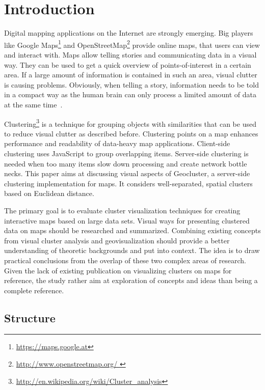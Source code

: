 
%
%

\chapter{Introduction}

Digital mapping applications on the Internet are strongly emerging. Big players like Google Maps\footnote{\url{https://maps.google.at}} and OpenStreetMap\footnote{\url{http://www.openstreetmap.org/ }} provide online maps, that users can view and interact with. Maps allow telling stories and communicating data in a visual way. They can be used to get a quick overview of points-of-interest in a certain area. If a large amount of information is contained in such an area, visual clutter is causing problems. Obviously, when telling a story, information needs to be told in a compact way as the human brain can only process a limited amount of data at the same time~\cite{noellenburg11geovis, Delort10vis}.

Clustering\footnote{\url{http://en.wikipedia.org/wiki/Cluster_analysis}} is a technique for grouping objects with similarities that can be used to reduce visual clutter as described before. Clustering points on a map enhances performance and readability of data-heavy map applications. Client-side clustering uses JavaScript to group overlapping items. Server-side clustering is needed when too many items slow down processing and create network bottle necks. This paper aims at discussing visual aspects of Geocluster, a server-side clustering implementation for maps. It considers well-separated, spatial clusters based on Euclidean distance.

The primary goal is to evaluate cluster visualization techniques for creating interactive maps based on large data sets. Visual ways for presenting clustered data on maps should be researched and summarized. Combining existing concepts from visual cluster analysis and geovisualization should provide a better understanding of theoretic backgrounds and put into context. The idea is to draw practical conclusions from the overlap of these two complex areas of research. Given the lack of existing publication on visualizing clusters on maps for reference, the study rather aim at exploration of concepts and ideas than being a complete reference. 


\section{Structure}

